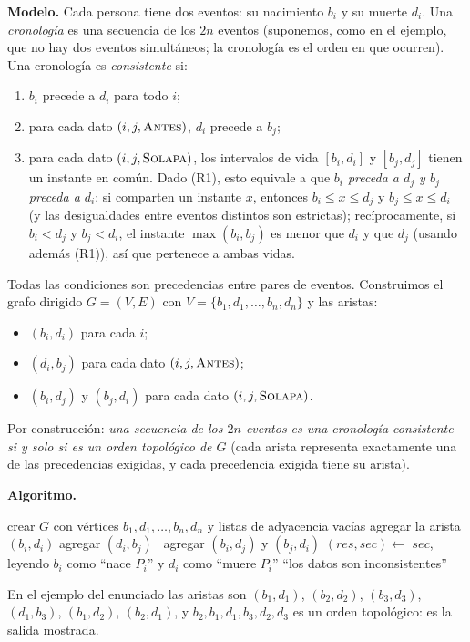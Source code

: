 \textbf{Modelo.} Cada persona tiene dos eventos: su nacimiento $b_i$ y su muerte $d_i$. Una
\emph{cronología} es una secuencia de los $2n$ eventos (suponemos, como en el ejemplo, que no hay dos
eventos simultáneos; la cronología es el orden en que ocurren). Una cronología es \emph{consistente} si:
\begin{enumerate}[nosep,label=(R\arabic*)]
\item $b_i$ precede a $d_i$ para todo $i$;
\item para cada dato $(i,j,\textsc{Antes})$, $d_i$ precede a $b_j$;
\item para cada dato $(i,j,\textsc{Solapa})$, los intervalos de vida $[b_i,d_i]$ y $[b_j,d_j]$ tienen un
instante en común. Dado (R1), esto equivale a que \emph{$b_i$ preceda a $d_j$ y $b_j$ preceda a $d_i$}:
si comparten un instante $x$, entonces $b_i\le x\le d_j$ y $b_j\le x\le d_i$ (y las desigualdades
entre eventos distintos son estrictas); recíprocamente, si $b_i<d_j$ y $b_j<d_i$, el instante
$\max(b_i,b_j)$ es menor que $d_i$ y que $d_j$ (usando además (R1)), así que pertenece a ambas vidas.
\end{enumerate}
Todas las condiciones son precedencias entre pares de eventos. Construimos el grafo dirigido $G=(V,E)$ con
$V=\{b_1,d_1,\dots,b_n,d_n\}$ y las aristas:
\begin{itemize}[nosep]
\item $(b_i,d_i)$ para cada $i$;
\item $(d_i,b_j)$ para cada dato $(i,j,\textsc{Antes})$;
\item $(b_i,d_j)$ y $(b_j,d_i)$ para cada dato $(i,j,\textsc{Solapa})$.
\end{itemize}
Por construcción: \emph{una secuencia de los $2n$ eventos es una cronología consistente si y solo si es un
orden topológico de $G$} (cada arista representa exactamente una de las precedencias exigidas, y cada
precedencia exigida tiene su arista).

\textbf{Algoritmo.}
\begin{algorithm}[H]
\caption{Cronología consistente}
\begin{algorithmic}[1]
  \State crear $G$ con vértices $b_1,d_1,\dots,b_n,d_n$ y listas de adyacencia vacías
   agregar la arista $(b_i,d_i)$ \EndFor
     agregar $(d_i,b_j)$
    \Else\ agregar $(b_i,d_j)$ y $(b_j,d_i)$
    \EndIf
  \EndFor
  \State $(res, sec)\gets$  
    \State \Return $sec$, leyendo $b_i$ como ``nace $P_i$'' y $d_i$ como ``muere $P_i$''
  \Else
    \State \Return ``los datos son inconsistentes''
  \EndIf
\EndFunction
\end{algorithmic}
\end{algorithm}
En el ejemplo del enunciado las aristas son $(b_1,d_1)$, $(b_2,d_2)$, $(b_3,d_3)$, $(d_1,b_3)$, $(b_1,d_2)$, $(b_2,d_1)$,
y $b_2,b_1,d_1,b_3,d_2,d_3$ es un orden topológico: es la salida mostrada.


